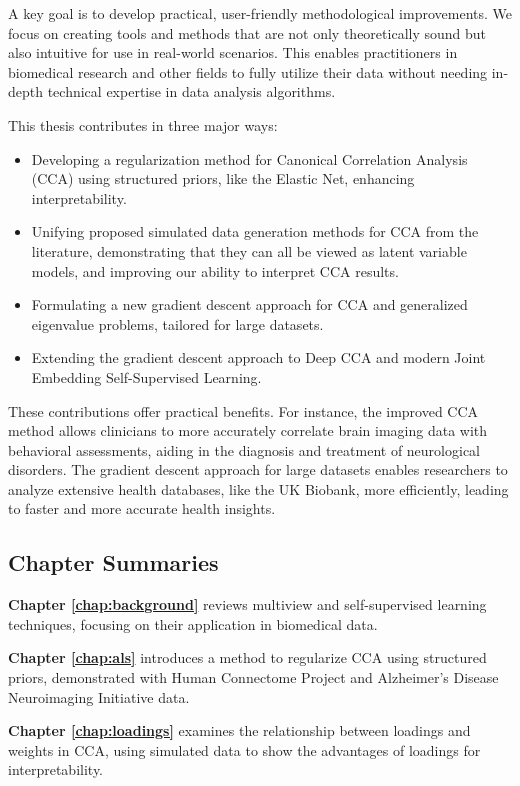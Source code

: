A key goal is to develop practical, user-friendly methodological improvements. We focus on creating tools and methods that are not only theoretically sound but also intuitive for use in real-world scenarios. This enables practitioners in biomedical research and other fields to fully utilize their data without needing in-depth technical expertise in data analysis algorithms.

This thesis contributes in three major ways:

\begin{itemize}
    \item Developing a regularization method for Canonical Correlation Analysis (CCA) using structured priors, like the Elastic Net, enhancing interpretability.
    \item Unifying proposed simulated data generation methods for CCA from the literature, demonstrating that they can all be viewed as latent variable models, and improving our ability to interpret CCA results.
    \item Formulating a new gradient descent approach for CCA and generalized eigenvalue problems, tailored for large datasets.
    \item Extending the gradient descent approach to Deep CCA and modern Joint Embedding Self-Supervised Learning.
\end{itemize}

These contributions offer practical benefits. For instance, the improved CCA method allows clinicians to more accurately correlate brain imaging data with behavioral assessments, aiding in the diagnosis and treatment of neurological disorders. The gradient descent approach for large datasets enables researchers to analyze extensive health databases, like the UK Biobank, more efficiently, leading to faster and more accurate health insights.

\subsection{Chapter Summaries}

\textbf{Chapter \ref{chap:background}} reviews multiview and self-supervised learning techniques, focusing on their application in biomedical data.

\textbf{Chapter \ref{chap:als}} introduces a method to regularize CCA using structured priors, demonstrated with Human Connectome Project and Alzheimer's Disease Neuroimaging Initiative data.

\textbf{Chapter \ref{chap:loadings}} examines the relationship between loadings and weights in CCA, using simulated data to show the advantages of loadings for interpretability.

